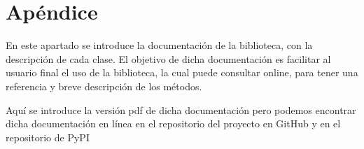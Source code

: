 \chapter{Apéndice}
En este apartado se introduce la documentación de la biblioteca,
con la descripción de cada clase. El objetivo de dicha documentación es 
facilitar al usuario final el uso de la biblioteca, la cual puede 
consultar online, para tener una referencia y breve
descripción de los métodos.

Aquí se introduce la versión pdf de dicha documentación pero
podemos encontrar dicha documentación en línea en el repositorio
del proyecto en GitHub \cite{Miki97TFGOutlierDetectionHttps} y en el repositorio de 
PyPI \cite{PyDBODDistancesBased}




%